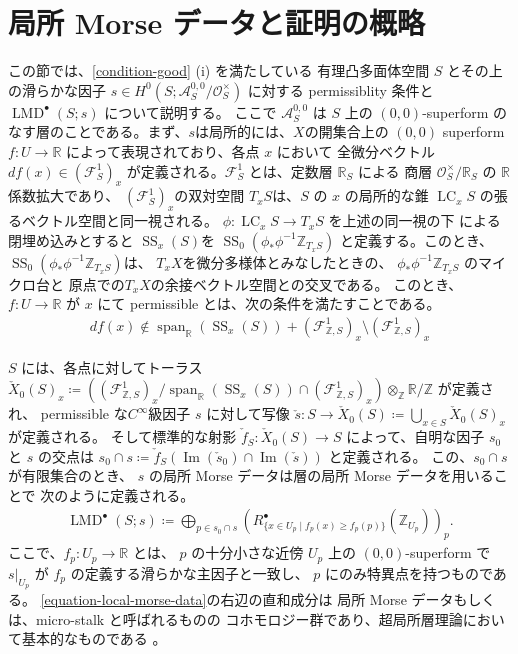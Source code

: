 \documentclass[uplatex,dvipdfmx,12pt]{jsarticle}
\numberwithin{equation}{section}
\theoremstyle{definition}
\newcommand{\deq}{\coloneqq}
\newcommand{\opn}[1]{\operatorname{#1}}
\newcommand{\beforesection}{\vspace{-20pt}}
\newcommand{\aftersection}{\vspace{-10pt}}
\begin{document}
\beforesection

\section{局所 Morse データと証明の概略}

\aftersection

この節では、\cref{condition-good} (i) を満たしている
有理凸多面体空間 $S$ とその上の滑らかな因子
$s\in H^{0}(S;\mathcal{A}_{S}^{0,0}/\mathcal{O}^{\times}_S)$
に対する permissiblity 条件と 
$\opn{LMD}^{\bullet}(S;s)$ について説明する。
ここで $\mathcal{A}^{0,0}_S$ は $S$ 上の $(0,0)$-superform
のなす層のことである\cite{MR3903579}。まず、$s$は局所的には、$X$の開集合上の 
$(0,0)$ superform $f\colon U\to \mathbb{R}$
によって表現されており、各点 $x$ において
全微分ベクトル $df(x)\in(\mathcal{F}_{S}^{1})_x$ 
が定義される。$\mathcal{F}_{S}^{1}$ とは、定数層
$\mathbb{R}_S$ による
商層 $\mathcal{O}^{\times}_{S}/\mathbb{R}_{S}$ 
の $\mathbb{R}$ 係数拡大であり、
$(\mathcal{F}_{S}^{1})_x$の双対空間
$T_x S$は、$S$ の $x$ の局所的な錐
$\opn{LC}_x S$ の張るベクトル空間と同一視される。
$\phi \colon \opn{LC}_x S\to T_x S$ を上述の同一視の下
による閉埋め込みとすると
$\opn{SS}_x (S)$を
$\opn{SS}_0(\phi_* \phi^{-1}\mathbb{Z}_{T_x S})$
と定義する。このとき、
$\opn{SS}_0(\phi_* \phi^{-1}\mathbb{Z}_{T_x S})$は、
$T_x X$を微分多様体とみなしたときの、
$\phi_* \phi^{-1}\mathbb{Z}_{T_x S}$ のマイクロ台と
原点での$T_x X$の余接ベクトル空間との交叉である。
このとき、
$f\colon U \to \mathbb{R}$ が $x$ にて permissible
とは、次の条件を満たすことである。
\begin{align}
df(x)\notin\opn{span}_{\mathbb{R}}(\opn{SS}_x(S))+
(\mathcal{F}_{\mathbb{Z},S}^{1})_x 
\setminus (\mathcal{F}_{\mathbb{Z},S}^{1})_x
\end{align}

$S$ には、各点に対してトーラス
$\check{X}_0(S)_x\deq ((\mathcal{F}^{1}_{\mathbb{Z},S})_x/
\opn{span}_{\mathbb{R}}(\opn{SS}_x(S))\cap 
(\mathcal{F}^{1}_{\mathbb{Z},S})_x)\otimes_{\mathbb{Z}}
\mathbb{R}/\mathbb{Z}$ が定義され、
permissible な$C^{\infty}$級因子 $s$ に対して写像
$\check{s}\colon S\to \check{X}_0(S)\deq 
\bigcup_{x\in S} \check{X}_0(S)_x$ が定義される。 
そして標準的な射影 $\check{f}_{S}\colon \check{X}_0(S)\to S$
によって、自明な因子 $s_0$ と $s$ の交点は
$s_0\cap s\deq \check{f}_{S}(\opn{Im}(\check{s}_0)\cap 
\opn{Im}(\check{s}))$ と定義される。
この、$s_0\cap s$ が有限集合のとき、
$s$ の局所 Morse データは層の局所 Morse データを用いることで
次のように定義される。
\begin{align} \label{equation-local-morse-data}
\opn{LMD}^{\bullet}(S;s)\deq 
\bigoplus_{p\in s_0\cap s} 
(R^{\bullet}_{\{x\in U_p\mid f_p(x)\geq f_p(p)\}}(\mathbb{Z}_{U_p}))_p.
\end{align}
ここで、$f_p\colon U_p\to \mathbb{R}$ とは、
$p$ の十分小さな近傍 $U_p$ 上の $(0,0)$-superform で
$s|_{U_p}$ が $f_p$ の定義する滑らかな主因子と一致し、
$p$ にのみ特異点を持つものである。 
\cref{equation-local-morse-data}の右辺の直和成分は
局所 Morse データもしくは、micro-stalk と呼ばれるものの
コホモロジー群であり、超局所層理論において基本的なものである
\cite{MR2031639,MR1299726}。
\end{document}
